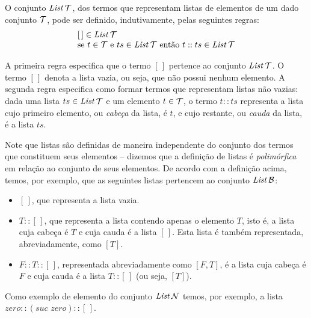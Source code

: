\begin{Definition}
O conjunto $\textit{List\/}\, \mathcal{T}$, dos termos que representam listas de elementos de um dado conjunto $\mathcal{T}$, pode ser definido, indutivamente, pelas seguintes regras:
  \[
  \begin{array}{l}
    [\,] \in \textit{List\/}\,\mathcal{T} \\
    \text{se $t \in \mathcal{T}$ e $ts \in \textit{List\/}\,\mathcal{T}$ ent\~ao  $t :: ts \in \textit{List\/}\,\mathcal{T}$}
  \end{array}
  \]
\end{Definition}
A primeira regra especifica que o termo $[\,]$ pertence ao conjunto $\textit{List\/}\,\mathcal{T}$. O termo $[\,]$  denota a lista vazia, ou seja, que n\~ao possui nenhum elemento. A segunda regra especifica como formar termos que representam listas não vazias: dada uma lista $ts \in \textit{List\/}\,\mathcal{T}$ e um elemento $t \in\mathcal{T}$, o termo $t :: ts$ representa a lista cujo primeiro elemento, ou \emph{cabeça} da lista, é $t$, e cujo restante, ou \emph{cauda} da lista, é a lista $ts$. 

Note que listas são definidas de maneira independente do conjunto dos termos que constituem seus elementos -- dizemos que a definição de listas \'e \emph{polim\'orfica\/} em rela\c{c}\~ao ao conjunto de seus elementos. De acordo com a definição acima, temos, por exemplo, que as seguintes listas pertencem ao conjunto $\textit{List\/}\,\mathcal{B}$:
\begin{itemize}
  \item $[\,]$, que representa a lista vazia.
  \item $T :: [\,]$, que representa a lista contendo apenas o elemento $T$, isto é, a lista cuja cabe\c{c}a \'e $T$ e cuja cauda é a lista $[\,]$. Esta lista é também representada, abreviadamente, como $[T]$.
  \item $F :: T :: [\,]$, representada abreviadamente como $[F,T]$, é a lista cuja cabe\c{c}a \'e $F$ e cuja cauda é a lista $T :: [\,]$ (ou seja, $[T]$).
\end{itemize}
Como exemplo de elemento do conjunto $\textit{List\/}\,\mathcal{N}$ temos, por exemplo, a lista $zero :: (suc\,\,zero) :: [\,]$.

